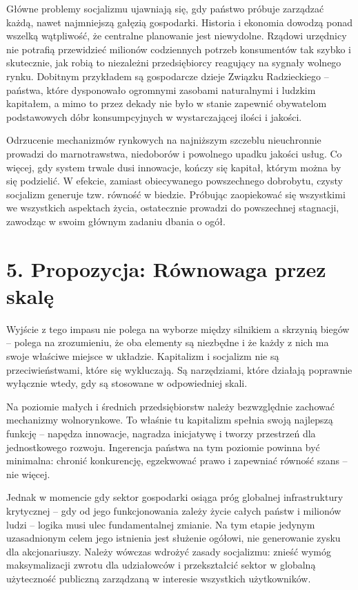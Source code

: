 \documentclass[12pt,a4paper]{article}
\begin{document}
Główne problemy socjalizmu ujawniają się, gdy państwo próbuje zarządzać każdą, nawet najmniejszą gałęzią gospodarki. Historia i ekonomia dowodzą ponad wszelką wątpliwość, że centralne planowanie jest niewydolne. Rządowi urzędnicy nie potrafią przewidzieć milionów codziennych potrzeb konsumentów tak szybko i skutecznie, jak robią to niezależni przedsiębiorcy reagujący na sygnały wolnego rynku. Dobitnym przykładem są gospodarcze dzieje Związku Radzieckiego -- państwa, które dysponowało ogromnymi zasobami naturalnymi i ludzkim kapitałem, a mimo to przez dekady nie było w stanie zapewnić obywatelom podstawowych dóbr konsumpcyjnych w wystarczającej ilości i jakości.

Odrzucenie mechanizmów rynkowych na najniższym szczeblu nieuchronnie prowadzi do marnotrawstwa, niedoborów i powolnego upadku jakości usług. Co więcej, gdy system trwale dusi innowacje, kończy się kapitał, którym można by się podzielić. W efekcie, zamiast obiecywanego powszechnego dobrobytu, czysty socjalizm generuje tzw. równość w biedzie. Próbując zaopiekować się wszystkimi we wszystkich aspektach życia, ostatecznie prowadzi do powszechnej stagnacji, zawodząc w swoim głównym zadaniu dbania o ogół.

\section*{5. Propozycja: Równowaga przez skalę}

Wyjście z tego impasu nie polega na wyborze między silnikiem a skrzynią
biegów -- polega na zrozumieniu, że oba elementy są niezbędne i że każdy
z nich ma swoje właściwe miejsce w układzie. Kapitalizm i socjalizm nie
są przeciwieństwami, które się wykluczają. Są narzędziami, które działają
poprawnie wyłącznie wtedy, gdy są stosowane w odpowiedniej skali.

Na poziomie małych i średnich przedsiębiorstw należy bezwzględnie zachować
mechanizmy wolnorynkowe. To właśnie tu kapitalizm spełnia swoją najlepszą
funkcję -- napędza innowacje, nagradza inicjatywę i tworzy przestrzeń dla
jednostkowego rozwoju. Ingerencja państwa na tym poziomie powinna być
minimalna: chronić konkurencję, egzekwować prawo i zapewniać równość
szans -- nie więcej.

Jednak w momencie gdy sektor gospodarki osiąga próg globalnej infrastruktury
krytycznej -- gdy od jego funkcjonowania zależy życie całych państw i milionów
ludzi -- logika musi ulec fundamentalnej zmianie. Na tym etapie jedynym
uzasadnionym celem jego istnienia jest służenie ogółowi, nie generowanie
zysku dla akcjonariuszy. Należy wówczas wdrożyć zasady socjalizmu: znieść
wymóg maksymalizacji zwrotu dla udziałowców i przekształcić sektor w
globalną użyteczność publiczną zarządzaną w interesie wszystkich użytkowników.
\end{document}
